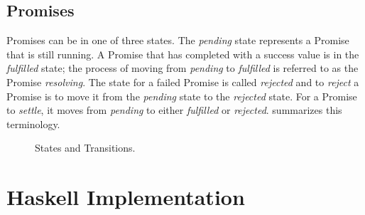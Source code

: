 \documentclass[12pt, english, letterpaper]{kuthesis}
\begin{document}
\section*{Promises}

\textsf{Promises} can be in one of three states.  The \emph{pending} state represents a \textsf{Promise} that is still running.  A \textsf{Promise} that has completed with a success value is in the \emph{fulfilled} state; the process of moving from \emph{pending} to \emph{fulfilled} is referred to as the \textsf{Promise} \emph{resolving}.  The state for a failed \textsf{Promise} is called \emph{rejected} and to \emph{reject} a \textsf{Promise} is to move it from the \emph{pending} state to the \emph{rejected} state.  For a \textsf{Promise} to \emph{settle}, it moves from \emph{pending} to either \emph{fulfilled} or \emph{rejected}.   summarizes this terminology.

\begin{figure}
\begin{center}  \end{center}
\caption{States and Transitions.}
\label{fig:states}
\end{figure}

\chapter*{Haskell Implementation}
\end{document}
